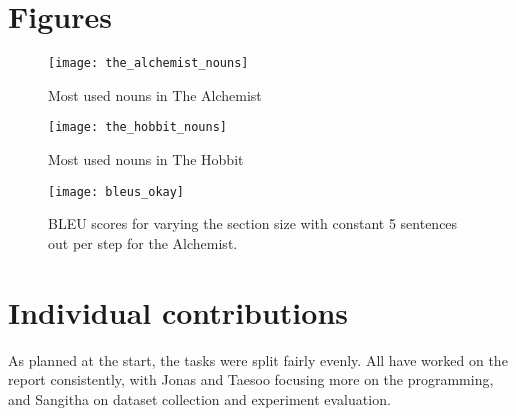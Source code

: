 \begin{appendices}
\section{Figures}
\label{appendix:countfigs}

\begin{figure}[H]
	\centering
	\texttt{[image: the\_alchemist\_nouns]}
	\caption{Most used nouns in The Alchemist}\label{fig:the_alchemist_nouns}
\end{figure}

\begin{figure}[H]
	\centering
	\texttt{[image: the\_hobbit\_nouns]}
	\caption{Most used nouns in The Hobbit}\label{fig:the_hobbit_nouns}
\end{figure}

\begin{figure}[H]
	\centering
	\texttt{[image: bleus\_okay]}
	\caption{BLEU scores for varying the section size with constant 5 sentences out per step for the Alchemist. }\label{fig:bleus_okay}
\end{figure}


\section{Individual contributions}
As planned at the start, the tasks were split fairly evenly. All have worked on the report consistently, with Jonas and Taesoo focusing more on the programming, and Sangitha on dataset collection and experiment evaluation.

\end{appendices}
